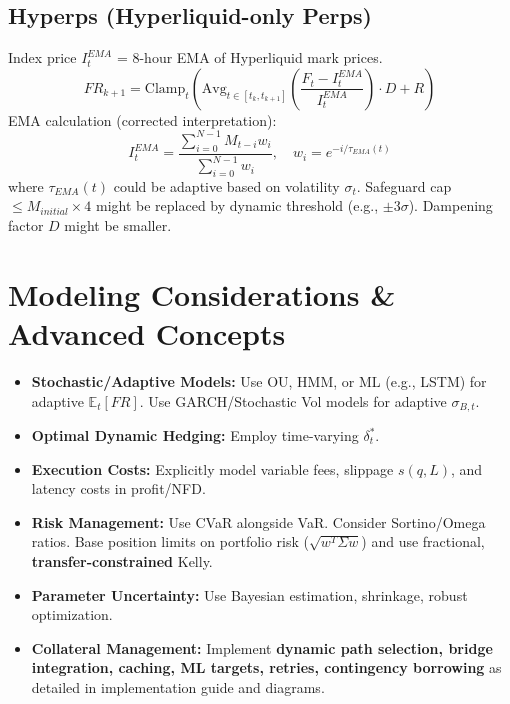 \documentclass{article}
\begin{document}
\subsection{Hyperps (Hyperliquid-only Perps)}
Index price $I^{EMA}_t$ = 8-hour EMA of Hyperliquid mark prices.
\begin{equation}
    FR_{k+1} = \text{Clamp}_t\left( \text{Avg}_{t \in [t_k, t_{k+1}]} \left( \frac{F_t - I^{EMA}_t}{I^{EMA}_t} \right) \cdot D + R \right)
\end{equation}
EMA calculation (corrected interpretation):
\begin{equation}
    I^{EMA}_t = \frac{\sum_{i=0}^{N-1} M_{t-i} w_i}{\sum_{i=0}^{N-1} w_i}, \quad w_i = e^{-i/\tau_{EMA}(t)}
\label{eq:hyperp_ema_adaptive}
\end{equation}
where $\tau_{EMA}(t)$ could be adaptive based on volatility $\sigma_t$. Safeguard cap $\le M_{initial} \times 4$ might be replaced by dynamic threshold (e.g., $\pm 3\sigma$). Dampening factor $D$ might be smaller.

\section{Modeling Considerations & Advanced Concepts}

\begin{itemize}
    \item \textbf{Stochastic/Adaptive Models:} Use OU, HMM, or ML (e.g., LSTM) for adaptive $\mathbb{E}_t[FR]$. Use GARCH/Stochastic Vol models for adaptive $\sigma_{B,t}$.
    \item \textbf{Optimal Dynamic Hedging:} Employ time-varying $\delta_t^*$.
    \item \textbf{Execution Costs:} Explicitly model variable fees, slippage $s(q,L)$, and latency costs in profit/NFD.
    \item \textbf{Risk Management:} Use CVaR alongside VaR. Consider Sortino/Omega ratios. Base position limits on portfolio risk ($\sqrt{w^T \Sigma w}$) and use fractional, \textbf{transfer-constrained} Kelly.
    \item \textbf{Parameter Uncertainty:} Use Bayesian estimation, shrinkage, robust optimization.
    \item \textbf{Collateral Management:} Implement \textbf{dynamic path selection, bridge integration, caching, ML targets, retries, contingency borrowing} as detailed in implementation guide and diagrams.
\end{itemize}
\end{document}
